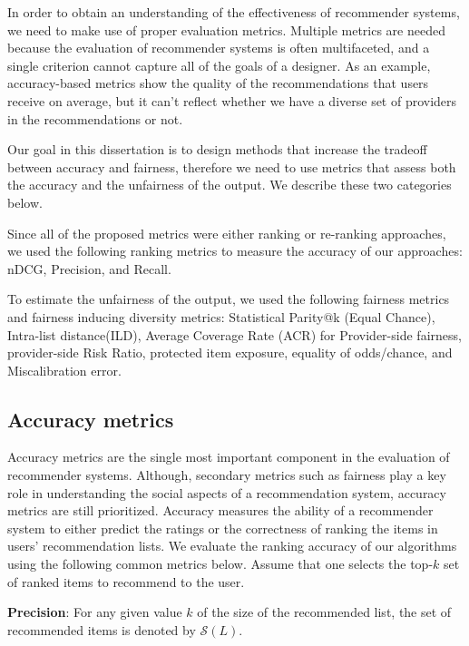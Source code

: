     In order to obtain an understanding of the effectiveness of recommender systems, we need to make use of proper evaluation metrics. Multiple metrics are needed because the evaluation of recommender systems is often multifaceted, and a single criterion cannot capture all of the goals of a designer. As an example, accuracy-based metrics show the quality of the recommendations that users receive on average, but it can't reflect whether we have a diverse set of providers in the recommendations or not. 
    
    Our goal in this dissertation is to design methods that increase the tradeoff between accuracy and fairness, therefore we need to use metrics that assess both the accuracy and the unfairness of the output. We describe these two categories below.
    
    Since all of the proposed metrics were either ranking or re-ranking approaches, we used the following ranking metrics to measure the accuracy of our approaches: nDCG, Precision, and Recall.
    
    To estimate the unfairness of the output, we used the following fairness metrics and fairness inducing diversity metrics: Statistical Parity@k (Equal Chance), Intra-list distance(ILD), Average Coverage Rate (ACR) for Provider-side fairness, provider-side Risk Ratio, protected item exposure, equality of odds/chance, and Miscalibration error.
    
    
    \subsection{Accuracy metrics}
    
    Accuracy metrics are the single most important component in the evaluation of recommender systems. Although, secondary metrics such as fairness play a key role in understanding the social aspects of a recommendation system, accuracy metrics are still prioritized. Accuracy measures the ability of a recommender system to either predict the ratings or the correctness of ranking the items in users' recommendation lists. We evaluate the ranking accuracy of our algorithms using the following common metrics below. Assume that one selects the top-$k$ set of ranked items to recommend to the user.
    
        \textbf{Precision}: For any given value $k$ of the size of the recommended list, the set of recommended items is denoted by $\mathcal{S}(L)$. 
        
